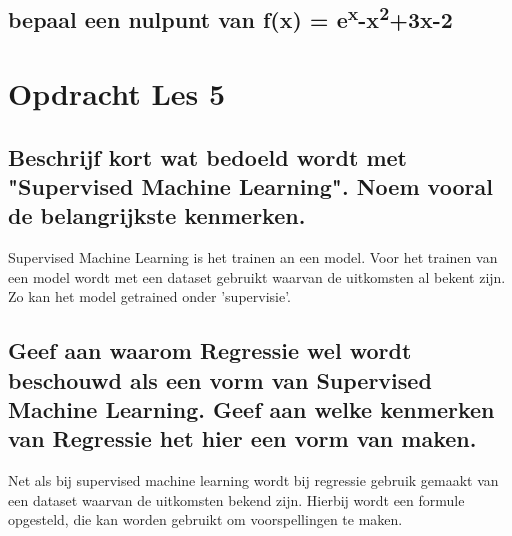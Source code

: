 \documentclass{article}%
\begin{document}
\subsection{\normalsize{bepaal een nulpunt van f(x) = e\textsuperscript{x}-x\textsuperscript{2}+3x-2}}

\section{Opdracht Les 5}
\subsection{\normalsize{Beschrijf kort wat bedoeld wordt met "Supervised Machine Learning". Noem vooral de belangrijkste kenmerken.}}

Supervised Machine Learning is het trainen an een model. Voor het trainen van een model wordt met een dataset gebruikt waarvan de uitkomsten al bekent zijn. 
Zo kan het model getrained onder 'supervisie'.

\subsection{\normalsize{Geef aan waarom Regressie wel wordt beschouwd als een vorm van Supervised Machine Learning. Geef aan welke kenmerken van Regressie het hier een vorm van maken.}}
Net als bij supervised machine learning wordt bij regressie gebruik gemaakt van een dataset waarvan de uitkomsten bekend zijn. Hierbij wordt een formule opgesteld, die kan worden gebruikt om voorspellingen te maken.

\newpage

\newpage


\end{document}
